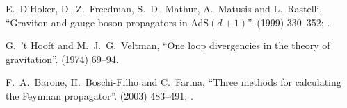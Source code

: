 \begin{thebibliography}{99}
E.~D'Hoker, D.~Z.~Freedman, S.~D.~Mathur, A.~Matusis and L.~Rastelli,
``Graviton and gauge boson propagators in AdS$(d+1)$''.
  (1999) 330--352;
.\newline
{\tt{}}

G.~'t Hooft and M.~J.~G.~Veltman,
``One loop divergencies in the theory of gravitation''.
  (1974) 69--94.

F.~A.~Barone, H.~Boschi-Filho and C.~Farina,
``Three methods for calculating the Feynman propagator''.
  (2003) 483--491; .\newline
{\tt{}}

\end{thebibliography}

